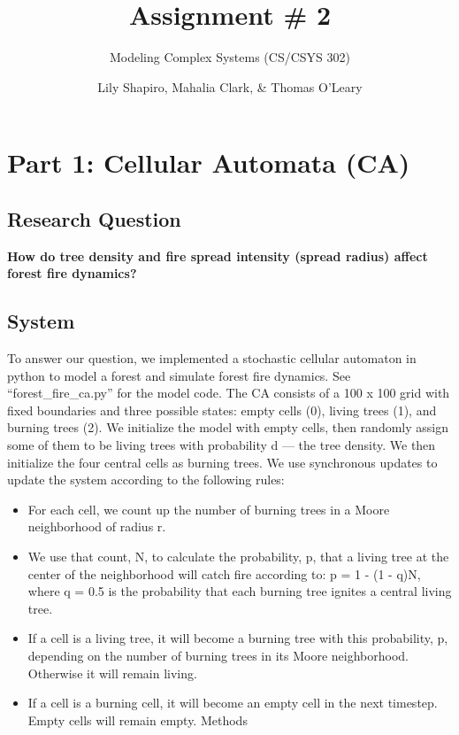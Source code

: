 \documentclass[]{article}
\title{Assignment \# 2}
\subtitle{Modeling Complex Systems (CS/CSYS 302)}
\author{Lily Shapiro, Mahalia Clark, \& Thomas O'Leary}
\date{}
\providecommand{\tightlist}{%
  \setlength{\itemsep}{0pt}\setlength{\parskip}{0pt}}
\begin{document}
\maketitle

\hypertarget{part-1-cellular-automata-ca}{%
\section{Part 1: Cellular Automata
(CA)}\label{part-1-cellular-automata-ca}}

\hypertarget{research-question}{%
\subsection{Research Question}\label{research-question}}

\textbf{How do tree density and fire spread intensity (spread radius)
affect forest fire dynamics?}

\hypertarget{system}{%
\subsection{System}\label{system}}

To answer our question, we implemented a stochastic cellular automaton
in python to model a forest and simulate forest fire dynamics. See
``forest\_fire\_ca.py'' for the model code. The CA consists of a 100 x
100 grid with fixed boundaries and three possible states: empty cells
(0), living trees (1), and burning trees (2). We initialize the model
with empty cells, then randomly assign some of them to be living trees
with probability d --- the tree density. We then initialize the four
central cells as burning trees. We use synchronous updates to update the
system according to the following rules:

\begin{itemize}
\tightlist
\item
  For each cell, we count up the number of burning trees in a Moore
  neighborhood of radius r.
\item
  We use that count, N, to calculate the probability, p, that a living
  tree at the center of the neighborhood will catch fire according to: p
  = 1 - (1 - q)N, where q = 0.5 is the probability that each burning
  tree ignites a central living tree.
\item
  If a cell is a living tree, it will become a burning tree with this
  probability, p, depending on the number of burning trees in its Moore
  neighborhood. Otherwise it will remain living.
\item
  If a cell is a burning cell, it will become an empty cell in the next
  timestep. Empty cells will remain empty. Methods
\end{itemize}
\end{document}

